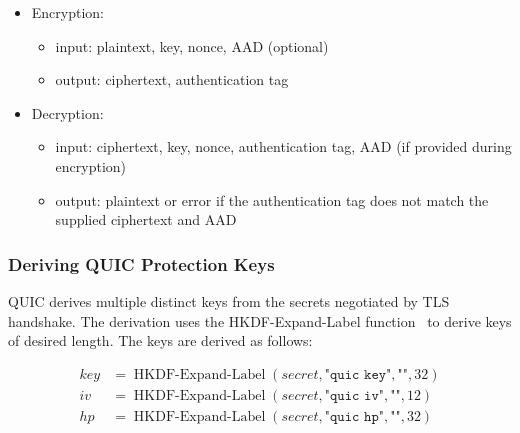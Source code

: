 \begin{itemize}

  \item Encryption:

  \begin{itemize}

    \item input: plaintext, key, nonce, AAD (optional)

    \item output: ciphertext, authentication tag

  \end{itemize}

  \item Decryption:

  \begin{itemize}

    \item input: ciphertext, key, nonce, authentication tag, AAD (if provided during encryption)

    \item output: plaintext or error if the authentication tag does not match the supplied
      ciphertext and AAD

  \end{itemize}

\end{itemize}

\subsubsection{Deriving QUIC Protection Keys}\label{sec:02-encryption-key-derivation}

QUIC derives multiple distinct keys from the secrets negotiated by TLS handshake. The derivation
uses the HKDF-Expand-Label function~\cite{rfc5869} to derive keys of desired length. The keys are
derived as follows:

\begin{equation*}
  \begin{split}
  key & = \operatorname{HKDF-Expand-Label}(secret, \texttt{"quic key"}, \texttt{""}, 32) \\
  iv  & = \operatorname{HKDF-Expand-Label}(secret, \texttt{"quic iv"}, \texttt{""}, 12)  \\
  hp  & = \operatorname{HKDF-Expand-Label}(secret, \texttt{"quic hp"}, \texttt{""}, 32)  \\
  \end{split}
\end{equation*}

